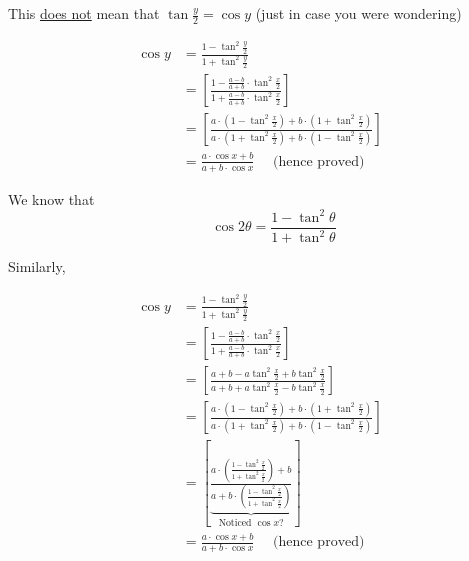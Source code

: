 \documentclass[14pt,fleqn]{extarticle}
\newcommand\tsqx{\tan^2\frac{x}{2}}
\newcommand\tsqy{\tan^2 \frac{y}{2}}
\newcommand\ea{\frac{a-b}{a+b}}
\begin{document}
\begin{question}
\begin{step}
This \underline{does not} mean that $\tan \frac{y}{2} = \cos y$ (just in case you 
were wondering) 

\end{step}

\begin{step}
  \begin{options} 
     \correct 
     
     \begin{align}
	\cos y &= \frac{1 - \tsqy}{1 + \tsqy} \\
	&= \left[ \frac{1-\ea\cdot\tsqx}{1 + \ea\cdot\tsqx}\right] \\
	&= \left[\frac{a\cdot \left(1-\tsqx \right) + b\cdot \left(1+\tsqx \right)}{a\cdot \left(1+\tsqx \right) + b\cdot \left(1-\tsqx \right)} \right] \\
	&= \frac{a\cdot\cos x + b}{a + b\cdot \cos x}\quad\text{ (hence proved)}
\end{align}

        
    \end{options} 
     \reason 

     We know that 
     \[ \qquad \cos 2\theta = \frac{1-\tan^2\theta}{1+\tan^2\theta}\]
     
     Similarly, 
     
     \begin{align}
	\cos y &= \frac{1 - \tsqy}{1 + \tsqy} \\
	&= \left[ \frac{1-\ea\cdot\tsqx}{1 + \ea\cdot\tsqx}\right] \\
	&= \left[\frac{a+b-a\tsqx + b\tsqx}{a+b+a\tsqx - b\tsqx} \right] \\
	&= \left[\frac{a\cdot \left(1-\tsqx \right) + b\cdot \left(1+\tsqx \right)}{a\cdot \left(1+\tsqx \right) + b\cdot \left(1-\tsqx \right)} \right] \\
	&= \left[\underbrace{\frac{a\cdot \left( \frac{1-\tsqx}{1+\tsqx}\right) + b}{a + b\cdot \left(\frac{1-\tsqx}{1+\tsqx}\right)}}_{\text{Noticed }\cos x?} \right] \\
	&= \frac{a\cdot\cos x + b}{a + b\cdot \cos x}\quad\text{ (hence proved)}
\end{align}
       
\end{step}
\end{question} 
\end{document}
